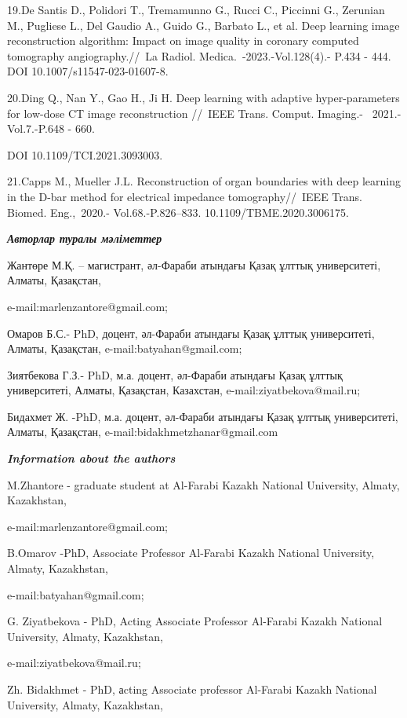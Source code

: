 19.De Santis D., Polidori T., Tremamunno G., Rucci C., Piccinni G.,
Zerunian M., Pugliese L., Del Gaudio A., Guido G., Barbato L., et al.
Deep learning image reconstruction algorithm: Impact on image quality in
coronary computed tomography angiography.//~La Radiol.
Medica.~-2023.-Vol.128(4).- P.434 - 444. DOI
10.1007/s11547-023-01607-8.~

20.Ding Q., Nan Y., Gao H., Ji H. Deep learning with adaptive
hyper-parameters for low-dose CT image reconstruction //~IEEE Trans.
Comput. Imaging.- \emph{~}2021.-Vol.7.-P.648 - 660.

DOI 10.1109/TCI.2021.3093003.~

21.Capps M., Mueller J.L. Reconstruction of organ boundaries with deep
learning in the D-bar method for electrical impedance tomography//~IEEE
Trans. Biomed. Eng.,\emph{~}2020.- Vol.68.-P.826--833.
10.1109/TBME.2020.3006175.~

\emph{\textbf{Авторлар туралы мәліметтер}}

Жантөре М.Қ. -- магистрант, әл-Фараби атындағы Қазақ ұлттық
университеті, Алматы, Қазақстан,

e-mail:marlenzantore@gmail.com;

Омаров Б.С.- PhD, доцент, әл-Фараби атындағы Қазақ ұлттық университеті,
Алматы, Қазақстан, e-mail:batyahan@gmail.com;

Зиятбекова Г.З.- PhD, м.а. доцент, әл-Фараби атындағы Қазақ ұлттық
университеті, Алматы, Қазақстан, Казахстан, e-mail:ziyatbekova@mail.ru;

Бидахмет Ж. -PhD, м.а. доцент, әл-Фараби атындағы Қазақ ұлттық
университеті, Алматы, Қазақстан, e-mail:bidakhmetzhanar@gmail.com

\emph{\textbf{Information about the authors}}

M.Zhantore - graduate student at Al-Farabi Kazakh National University,
Almaty, Kazakhstan,

e-mail:marlenzantore@gmail.com;

B.Omarov -PhD, Associate Professor Al-Farabi Kazakh National University,
Almaty, Kazakhstan,

e-mail:batyahan@gmail.com;

G. Ziyatbekova - PhD, Acting Associate Professor Al-Farabi Kazakh
National University, Almaty, Kazakhstan,

e-mail:ziyatbekova@mail.ru;

Zh. Bidakhmet - PhD, аcting Associate professor Al-Farabi Kazakh
National University, Almaty, Kazakhstan,

